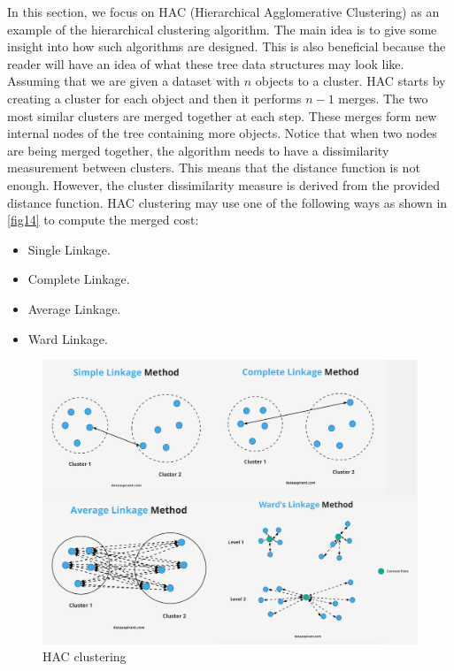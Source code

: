 \documentclass[a4paper, 12pt]{article}
\begin{document}
In this section, we focus on HAC (Hierarchical Agglomerative Clustering) as an example of the hierarchical clustering algorithm. The main idea is to give some insight into how such algorithms are designed. This is also beneficial because the reader will have an idea of what these tree data structures may look like. Assuming that we are given a dataset with $n$ objects to a cluster. HAC starts by creating a cluster for each object and then it performs $n - 1$ merges. The two most similar clusters are merged together at each step. These merges form new internal nodes of the tree containing more objects. Notice that when two nodes are being merged together, the algorithm needs to have a dissimilarity measurement between clusters. This means that the distance function is not enough. However, the cluster dissimilarity measure is derived from the provided distance function. HAC clustering may use one of the following ways as shown in \autoref{fig14} to compute the merged cost:
\begin{itemize}
    \item Single Linkage.
    \item Complete Linkage.
    \item Average Linkage.
    \item Ward Linkage.
\end{itemize}

\begin{figure}[ht]
    \centering
    \includegraphics[width=1\textwidth]{HAC Clustering.png}
    \caption{HAC clustering \citep{hierarchicalcluster2020}}
    \label{fig14}
\end{figure}
\end{document}

